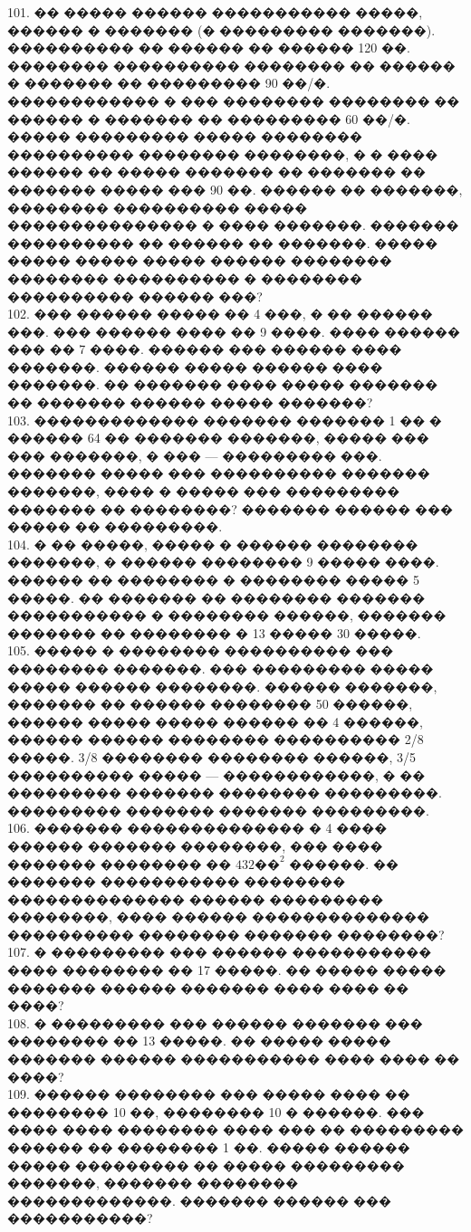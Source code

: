 \documentclass[12pt]{article}
\begin{document}
101. �� ����� ������ ����������� �����, ������ � ������� (� ��������� �������). ���������� �� ������ �� ������ 120 ��. �������� ���������� �������� �� ������ � ������� �� ��������� 90 ��/�. ������������ � ��� �������� �������� �� ������ � ������� �� ��������� 60 ��/�. ����� ��������� ����� �������� ���������� �������� ��������, � � ���� ������ �� ����� ������� �� ������� �� ������� ����� ��� 90 ��. ������ �� �������, �������� ���������� ����� ��������������� � ���� �������. ������� ���������� �� ������ �� �������. ����� ����� ����� ����� ������ �������� �������� ���������� � �������� ���������� ������ ���?\\
102. ��� ������ ����� �� 4 ���, � �� ������ ���. ��� ������ ���� �� 9 ����. ���� ������ ��� �� 7 ����. ������ ��� ������ ���� �������. ������ ����� ������ ���� �������. �� ������� ���� ����� ������� �� ������� ������ ����� �������?\\
103. ������������� ������� ������� 1 �� � ������ 64 �� ������� �������, ����� ��� ��� �������, � ��� --- ��������� ���. ������� ����� ��� ���������� ������� �������, ���� � ����� ��� ��������� ������� �� ��������? ������� ������ ��� ����� �� ���������.\\
104. � �� �����, ����� � ������ �������� �������, � ������ �������� 9 ����� ����. ������ �� �������� � �������� ����� 5 �����. �� ������� �� �������� ������� ����������� � �������� ������, ������� ������� �� �������� � 13 ����� 30 �����.\\
105. ����� � �������� ���������� ��� �������� �������. ��� ��������� ����� ����� ������ ��������. ������ �������, ������� �� ������ �������� 50 ������, ������ ����� ����� ������ �� 4 ������, ������ ������ �������� ���������� 2/8 �����. 3/8 �������� �������� ������, 3/5 ���������� ����� --- ������������, � �� ��������� ������� �������� ���������. ��������� ������� ������� ���������.\\
106. ������� �������������� � 4 ���� ������ ������� ��������, ��� ���� ������� �������� �� $432\text{��}^2$ ������. �� ������� ����������� �������� �������������� ������ ��������� ��������, ���� ������ �������������� ���������� �������� ������� ��������?\\
107. � ��������� ��� ������ ����������� ���� �������� �� 17 �����. �� ����� ����� ������� ������ ������� ���� ���� �� ����?\\
108. � ��������� ��� ������ ������� ��� �������� �� 13 �����. �� ����� ����� ������� ������ ����������� ���� ���� �� ����?\\
109. ������ �������� ��� ����� ���� �� �������� 10 ��, �������� 10 � ������. ��� ���� ���� �������� ���� ��� �� ��������� ������ �� �������� 1 ��. ����� ������ ����� ��������� �� ����� ��������� �������, ������� �������� �������������. ������� ������ ��� �����������?\\
\end{document}
